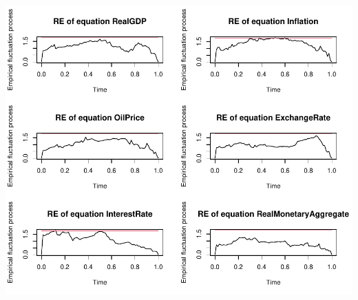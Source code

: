 \documentclass[11pt,preprint, authoryear]{elsarticle}
\let\origfigure\figure
\let\endorigfigure\endfigure
\renewenvironment{figure}[1][2] {
    \expandafter\origfigure\expandafter[H]
} {
    \endorigfigure
}
\numberwithin{equation}{section}
\numberwithin{figure}{section}
\numberwithin{table}{section}
\begin{document}
\begin{figure}
\centering
\includegraphics{Time_Series_Proj_Data_files/figure-latex/unnamed-chunk-12-1.pdf}
\caption{Empirical fluctuation plot for VAR(2) \label{figA8}}
\end{figure}


\end{document}

